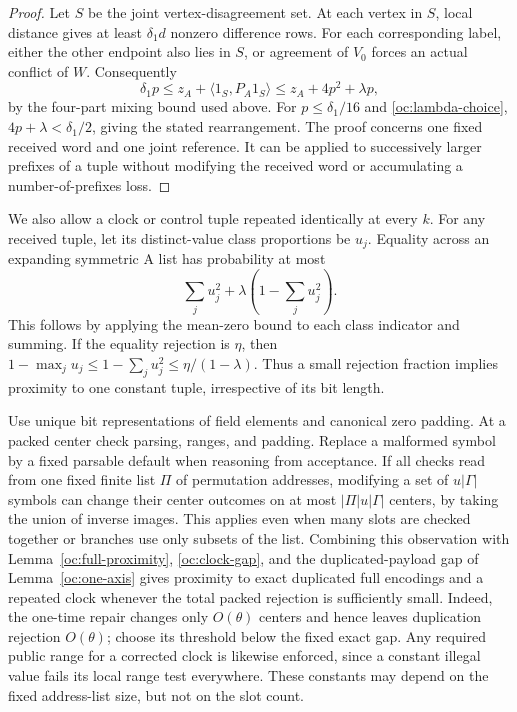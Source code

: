 \begin{proof}
Let $S$ be the joint vertex-disagreement set.  At each vertex in $S$,
local distance gives at least $\delta_1d$ nonzero difference rows.
For each corresponding label, either the other endpoint also lies
in $S$, or agreement of $V_0$ forces an actual conflict of $W$.
Consequently
\[
 \delta_1p\le z_A+\langle1_S,P_A1_S\rangle
 \le z_A+4p^2+\lambda p,
\]
by the four-part mixing bound used above.  For
$p\le\delta_1/16$ and \eqref{oc:lambda-choice},
$4p+\lambda<\delta_1/2$, giving the stated rearrangement.
The proof concerns one fixed received word and one joint reference.
It can be applied to successively larger prefixes of a tuple without
modifying the received word or accumulating a number-of-prefixes
loss.
\end{proof}

We also allow a clock or control tuple repeated identically at every
$k$.  For any received tuple, let its distinct-value class proportions
be $u_j$.  Equality across an expanding symmetric A list has probability
at most
\begin{equation}\label{oc:clock-gap}
 \sum_j u_j^2+\lambda\left(1-\sum_j u_j^2\right).
\end{equation}
This follows by applying the mean-zero bound to each class indicator
and summing.  If the equality rejection is $\eta$, then
$1-\max_j u_j\le1-\sum_j u_j^2\le\eta/(1-\lambda)$.
Thus a small rejection fraction implies proximity to one constant
tuple, irrespective of its bit length.

Use unique bit representations of field elements and canonical zero
padding.  At a packed center check parsing, ranges, and padding.
Replace a malformed symbol by a fixed parsable default when reasoning
from acceptance.  If all checks read from one fixed finite list
$\Pi$ of permutation addresses, modifying a set of $u|\Gamma|$
symbols can change their center outcomes on at most
$|\Pi|u|\Gamma|$ centers, by taking the union of inverse images.
This applies even when many slots are checked together or branches
use only subsets of the list.  Combining this observation with
Lemma~\ref{oc:full-proximity}, \eqref{oc:clock-gap}, and the
duplicated-payload gap of Lemma~\ref{oc:one-axis} gives proximity
to exact duplicated full encodings and a repeated clock whenever
the total packed rejection is sufficiently small.  Indeed, the
one-time repair changes only $O(\theta)$ centers and hence leaves
duplication rejection $O(\theta)$; choose its threshold below the
fixed exact gap.  Any required public range for a corrected clock
is likewise enforced, since a constant illegal value fails its
local range test everywhere.  These constants may depend on the
fixed address-list size, but not on the slot count.

